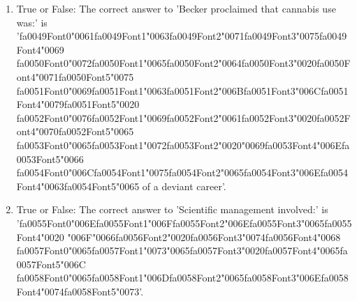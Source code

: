 \documentclass[12pt]{article}
\begin{document}
\begin{enumerate}[label=\arabic*.]
\item True or False: The correct answer to 'Becker proclaimed that cannabis use was:' is '{\csname fa0049Font0\endcsname\char"0061}{\csname fa0049Font1\endcsname\char"0063}{\csname fa0049Font2\endcsname\char"0071}{\csname fa0049Font3\endcsname\char"0075}{\csname fa0049Font4\endcsname\char"0069} {\csname fa0050Font0\endcsname\char"0072}{\csname fa0050Font1\endcsname\char"0065}{\csname fa0050Font2\endcsname\char"0064}{\csname fa0050Font3\endcsname\char"0020}{\csname fa0050Font4\endcsname\char"0071}{\csname fa0050Font5\endcsname\char"0075} {\csname fa0051Font0\endcsname\char"0069}{\csname fa0051Font1\endcsname\char"0063}{\csname fa0051Font2\endcsname\char"006B}{\csname fa0051Font3\endcsname\char"006C}{\csname fa0051Font4\endcsname\char"0079}{\csname fa0051Font5\endcsname\char"0020} {\csname fa0052Font0\endcsname\char"0076}{\csname fa0052Font1\endcsname\char"0069}{\csname fa0052Font2\endcsname\char"0061}{\csname fa0052Font3\endcsname\char"0020}{\csname fa0052Font4\endcsname\char"0070}{\csname fa0052Font5\endcsname\char"0065} {\csname fa0053Font0\endcsname\char"0065}{\csname fa0053Font1\endcsname\char"0072}{\csname fa0053Font2\endcsname\char"0020}{\char"0069}{\csname fa0053Font4\endcsname\char"006E}{\csname fa0053Font5\endcsname\char"0066} {\csname fa0054Font0\endcsname\char"006C}{\csname fa0054Font1\endcsname\char"0075}{\csname fa0054Font2\endcsname\char"0065}{\csname fa0054Font3\endcsname\char"006E}{\csname fa0054Font4\endcsname\char"0063}{\csname fa0054Font5\endcsname\char"0065} of a deviant career'.
\item True or False: The correct answer to 'Scientific management involved:' is '{\csname fa0055Font0\endcsname\char"006E}{\csname fa0055Font1\endcsname\char"006F}{\csname fa0055Font2\endcsname\char"006E}{\csname fa0055Font3\endcsname\char"0065}{\csname fa0055Font4\endcsname\char"0020} {\char"006F}{\char"0066}{\csname fa0056Font2\endcsname\char"0020}{\csname fa0056Font3\endcsname\char"0074}{\csname fa0056Font4\endcsname\char"0068} {\csname fa0057Font0\endcsname\char"0065}{\csname fa0057Font1\endcsname\char"0073}{\char"0065}{\csname fa0057Font3\endcsname\char"0020}{\csname fa0057Font4\endcsname\char"0065}{\csname fa0057Font5\endcsname\char"006C} {\csname fa0058Font0\endcsname\char"0065}{\csname fa0058Font1\endcsname\char"006D}{\csname fa0058Font2\endcsname\char"0065}{\csname fa0058Font3\endcsname\char"006E}{\csname fa0058Font4\endcsname\char"0074}{\csname fa0058Font5\endcsname\char"0073}'.

\end{enumerate}
\end{document}
